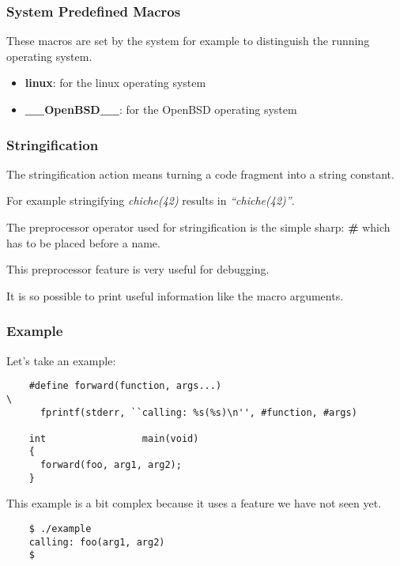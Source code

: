 \documentclass[8pt]{beamer}
\newcommand{\nl}[0]{\vspace{0.4cm}}
\begin{document}

\begin{frame}
  \frametitle{System Predefined Macros}

  These macros are set by the system for example to distinguish the
  running operating system.

  \begin{itemize}[<+->]
    \item
      \textbf{linux}: for the linux operating system
    \item
      \textbf{\_\_OpenBSD\_\_}: for the OpenBSD operating system
  \end{itemize}
\end{frame}


\begin{frame}
  \frametitle{Stringification}

  The stringification action means turning a code fragment into
  a string constant.

  \nl

  For example stringifying \textit{chiche(42)} results in
  \textit{``chiche(42)''}.

  \nl

  The preprocessor operator used for stringification is the simple sharp:
  \textbf{\#} which has to be placed before a name.

  \nl

  This preprocessor feature is very useful for debugging.

  \nl

  It is so possible to print useful information like the macro arguments.
\end{frame}


\begin{frame}[containsverbatim]
  \frametitle{Example}

  Let's take an example:

  \begin{verbatim}
    #define forward(function, args...)                                  \
      fprintf(stderr, ``calling: %s(%s)\n'', #function, #args)

    int                 main(void)
    {
      forward(foo, arg1, arg2);
    }
  \end{verbatim}

  This example is a bit complex because it uses a feature we have not seen
  yet.

  \begin{verbatim}
    $ ./example
    calling: foo(arg1, arg2)
    $ 
  \end{verbatim}
\end{frame}
\end{document}
